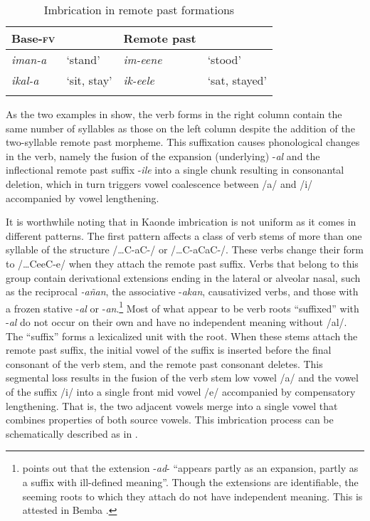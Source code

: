 \documentclass[output=paper]{langsci/langscibook}
\begin{document}
\begin{table}
\begin{tabularx}{.75\textwidth}{XXlX}
\lsptoprule
Base-\textsc{fv} &  & Remote past & \\
\midrule
\textit{iman-a} & `stand' & \textit{im-eene} & `stood' \\
\textit{ikal-a} & `sit, stay' & \textit{ik-eele} & `sat, stayed' \\

\lspbottomrule
\end{tabularx}

\caption{Imbrication in remote past formations}
\label{tab:19.kawasha}

\end{table}

As the two examples in  show, the verb forms in the right column contain the same number of syllables as those on the left column despite the addition of the two-syllable remote past morpheme. This suffixation causes phonological changes in the verb, namely the fusion of the expansion (underlying) -\textit{al} and the inflectional remote past suffix -\textit{ile} into a single chunk resulting in consonantal deletion, which in turn triggers vowel coalescence between /a/ and /i/ accompanied by vowel lengthening. 

It is worthwhile noting that in Kaonde imbrication is not uniform as it comes in different patterns. The first pattern affects a class of verb stems of more than one syllable of the structure /…C-aC-/ or /…C-aCaC-/. These verbs change their form to /…CeeC-e/ when they attach the remote past suffix. Verbs that belong to this group contain derivational extensions ending in the lateral or alveolar nasal, such as the reciprocal \textit{-añan}, the associative -\textit{akan}, causativized verbs, and those with a frozen stative -\textit{al} or -\textit{an}.\footnote{\citet[90]{meeussen1967} points out that the extension -\textit{ad}- “appears partly as an expansion, partly as a suffix with ill-defined meaning”. Though the extensions are identifiable, the seeming roots to which they attach do not have independent meaning. This is attested in Bemba \citep{hyman1995}.} Most of what appear to be verb roots “suffixed” with -\textit{al} do not occur on their own and have no independent meaning without /al/. The “suffix” forms a lexicalized unit with the root. When these stems attach the remote past suffix, the initial vowel of the suffix is inserted before the final consonant of the verb stem, and the remote past consonant deletes. This segmental loss results in the fusion of the verb stem low vowel /a/ and the vowel of the suffix /i/ into a single front mid vowel /e/ accompanied by compensatory lengthening. That is, the two adjacent vowels merge into a single vowel that combines properties of both source vowels. This imbrication process can be schematically described as in .
\end{document}
